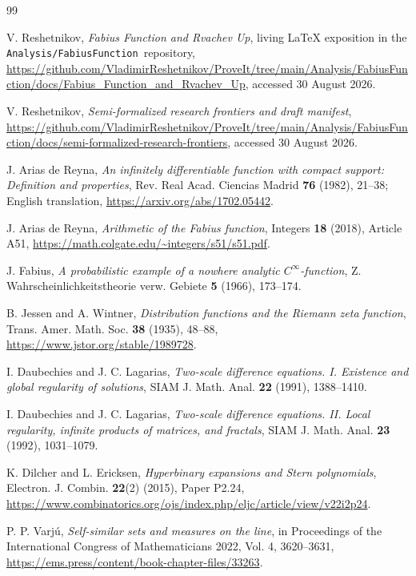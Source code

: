 \documentclass[11pt,oneside]{article}
\theoremstyle{definition}
\theoremstyle{remark}
\newcommand{\repo}{\nolinkurl{Analysis/FabiusFunction}}
\numberwithin{equation}{section}
\newcommand{\1}{\mathbf 1}
\begin{document}
\begin{thebibliography}{99}

V. Reshetnikov,
\emph{Fabius Function and Rvachev Up}, living LaTeX exposition in the \repo\ repository,
\url{https://github.com/VladimirReshetnikov/ProveIt/tree/main/Analysis/FabiusFunction/docs/Fabius_Function_and_Rvachev_Up},
accessed 30 August 2026.

V. Reshetnikov,
\emph{Semi-formalized research frontiers and draft manifest},
\url{https://github.com/VladimirReshetnikov/ProveIt/tree/main/Analysis/FabiusFunction/docs/semi-formalized-research-frontiers},
accessed 30 August 2026.

J. Arias de Reyna,
\emph{An infinitely differentiable function with compact support: Definition and properties},
Rev. Real Acad. Ciencias Madrid \textbf{76} (1982), 21--38; English translation,
\url{https://arxiv.org/abs/1702.05442}.

J. Arias de Reyna,
\emph{Arithmetic of the Fabius function},
Integers \textbf{18} (2018), Article A51,
\url{https://math.colgate.edu/~integers/s51/s51.pdf}.

J. Fabius,
\emph{A probabilistic example of a nowhere analytic $C^\infty$-function},
Z. Wahrscheinlichkeitstheorie verw. Gebiete \textbf{5} (1966), 173--174.

B. Jessen and A. Wintner,
\emph{Distribution functions and the Riemann zeta function},
Trans. Amer. Math. Soc. \textbf{38} (1935), 48--88,
\url{https://www.jstor.org/stable/1989728}.

I. Daubechies and J. C. Lagarias,
\emph{Two-scale difference equations. I. Existence and global regularity of solutions},
SIAM J. Math. Anal. \textbf{22} (1991), 1388--1410.

I. Daubechies and J. C. Lagarias,
\emph{Two-scale difference equations. II. Local regularity, infinite products of matrices,
and fractals},
SIAM J. Math. Anal. \textbf{23} (1992), 1031--1079.

K. Dilcher and L. Ericksen,
\emph{Hyperbinary expansions and Stern polynomials},
Electron. J. Combin. \textbf{22}(2) (2015), Paper P2.24,
\url{https://www.combinatorics.org/ojs/index.php/eljc/article/view/v22i2p24}.

P. P. Varj\'u,
\emph{Self-similar sets and measures on the line},
in Proceedings of the International Congress of Mathematicians 2022, Vol. 4,
3620--3631,
\url{https://ems.press/content/book-chapter-files/33263}.

\end{thebibliography}
\end{document}
